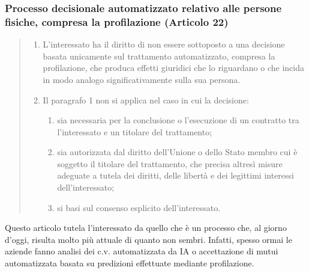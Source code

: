 \subsubsection*{Processo decisionale automatizzato relativo alle persone fisiche, compresa la profilazione (Articolo 22)}
\begin{quote}
    \begin{enumerate}
        \item L'interessato ha il diritto di non essere sottoposto a una decisione basata unicamente sul trattamento automatizzato, compresa la profilazione, che produca effetti giuridici che lo riguardano o che incida in modo analogo significativamente sulla sua persona.
        \item Il paragrafo 1 non si applica nel caso in cui la decisione: 
            \begin{enumerate}[label=\alph*)]
                \item sia necessaria per la conclusione o l'esecuzione di un contratto tra l'interessato e un titolare del trattamento;
                \item sia autorizzata dal diritto dell'Unione o dello Stato membro cui è soggetto il titolare del trattamento, che precisa altresì misure adeguate a tutela dei diritti, delle libertà e dei legittimi interessi dell'interessato;
                \item si basi sul consenso esplicito dell'interessato.
            \end{enumerate}
    \end{enumerate}
\end{quote}
Questo articolo tutela l'interessato da quello che è un processo che, al giorno d'oggi, risulta molto più attuale di quanto non sembri.
Infatti, spesso ormai le aziende fanno analisi dei c.v. automatizzata da IA o accettazione di mutui automatizzata basata su predizioni effettuate mediante profilazione.
